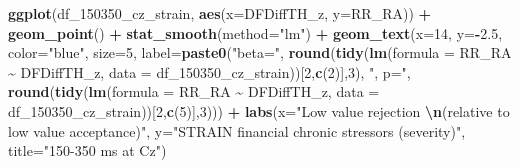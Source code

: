 \documentclass[
]{article}
\newenvironment{Shaded}{\begin{snugshade}}{\end{snugshade}}
\newcommand{\AttributeTok}[1]{\textcolor[rgb]{0.13,0.29,0.53}{#1}}
\newcommand{\DecValTok}[1]{\textcolor[rgb]{0.00,0.00,0.81}{#1}}
\newcommand{\FloatTok}[1]{\textcolor[rgb]{0.00,0.00,0.81}{#1}}
\newcommand{\FunctionTok}[1]{\textcolor[rgb]{0.13,0.29,0.53}{\textbf{#1}}}
\newcommand{\NormalTok}[1]{#1}
\newcommand{\SpecialCharTok}[1]{\textcolor[rgb]{0.81,0.36,0.00}{\textbf{#1}}}
\newcommand{\StringTok}[1]{\textcolor[rgb]{0.31,0.60,0.02}{#1}}
\begin{document}
\begin{Shaded}
\begin{Highlighting}[]
\FunctionTok{ggplot}\NormalTok{(df\_150350\_cz\_strain, }\FunctionTok{aes}\NormalTok{(}\AttributeTok{x=}\NormalTok{DFDiffTH\_z, }\AttributeTok{y=}\NormalTok{RR\_RA)) }\SpecialCharTok{+}
  \FunctionTok{geom\_point}\NormalTok{() }\SpecialCharTok{+}
  \FunctionTok{stat\_smooth}\NormalTok{(}\AttributeTok{method=}\StringTok{"lm"}\NormalTok{) }\SpecialCharTok{+}
  \FunctionTok{geom\_text}\NormalTok{(}\AttributeTok{x=}\DecValTok{14}\NormalTok{, }\AttributeTok{y=}\SpecialCharTok{{-}}\FloatTok{2.5}\NormalTok{, }\AttributeTok{color=}\StringTok{"blue"}\NormalTok{, }\AttributeTok{size=}\DecValTok{5}\NormalTok{, }\AttributeTok{label=}\FunctionTok{paste0}\NormalTok{(}\StringTok{"beta="}\NormalTok{,}
       \FunctionTok{round}\NormalTok{(}\FunctionTok{tidy}\NormalTok{(}\FunctionTok{lm}\NormalTok{(}\AttributeTok{formula =}\NormalTok{ RR\_RA }\SpecialCharTok{\textasciitilde{}}\NormalTok{ DFDiffTH\_z, }\AttributeTok{data =}\NormalTok{ df\_150350\_cz\_strain))[}\DecValTok{2}\NormalTok{,}\FunctionTok{c}\NormalTok{(}\DecValTok{2}\NormalTok{)],}\DecValTok{3}\NormalTok{),}
       \StringTok{", p="}\NormalTok{, }
       \FunctionTok{round}\NormalTok{(}\FunctionTok{tidy}\NormalTok{(}\FunctionTok{lm}\NormalTok{(}\AttributeTok{formula =}\NormalTok{ RR\_RA }\SpecialCharTok{\textasciitilde{}}\NormalTok{ DFDiffTH\_z, }\AttributeTok{data =}\NormalTok{ df\_150350\_cz\_strain))[}\DecValTok{2}\NormalTok{,}\FunctionTok{c}\NormalTok{(}\DecValTok{5}\NormalTok{)],}\DecValTok{3}\NormalTok{))) }\SpecialCharTok{+}
    \FunctionTok{labs}\NormalTok{(}\AttributeTok{x=}\StringTok{"Low value rejection }\SpecialCharTok{\textbackslash{}n}\StringTok{(relative to low value acceptance)"}\NormalTok{,}
       \AttributeTok{y=}\StringTok{"STRAIN financial chronic stressors (severity)"}\NormalTok{,}
       \AttributeTok{title=}\StringTok{"150{-}350 ms at Cz"}\NormalTok{)}


\end{Highlighting}
\end{Shaded}
\end{document}
